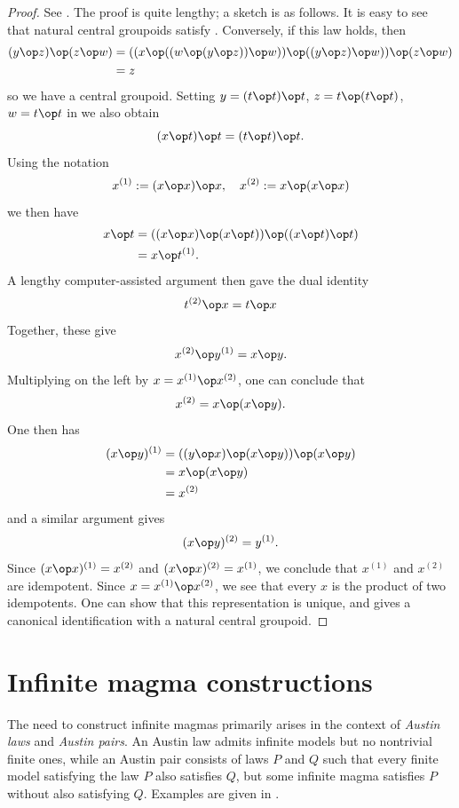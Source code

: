 \begin{proof}
  See \cite[Theorem 5]{knuth}.  The proof is quite lengthy; a sketch is as follows. It is easy to see that natural central groupoids satisfy .  Conversely, if this law holds, then
\begin{align*}
  (y \op z) \op (z \op w) &= (( x \op ((w \op (y \op z)) \op w)) \op ((y \op z) \op w)) \op (z \op w)\\
  &= z
\end{align*}
so we have a central groupoid.  Setting $y = (t \op t) \op t$, $z = t \op (t \op t)$, $w = t \op t$ in  we also obtain
$$ (x \op t) \op t = (t \op t) \op t.$$
Using the notation
$$ x^{(1)} := (x \op x) \op x, \quad x^{(2)} := x \op (x \op x)$$
we then have
\begin{align*}
  x \op t &= ((x \op x) \op (x \op t)) \op ((x \op t) \op t) \\
  &= x \op t^{(1)}.
\end{align*}
A lengthy computer-assisted argument then gave the dual identity
$$ t^{(2)} \op x = t \op x$$
Together, these give
$$ x^{(2)} \op y^{(1)} = x \op y.$$
Multiplying on the left by $x = x^{(1)}\op x^{(2)}$, one can conclude that
$$ x^{(2)} = x \op (x \op y).$$
One then has
\begin{align*}
  (x \op y)^{(1)} &= ((y \op x) \op (x \op y)) \op (x \op y) \\
&= x \op (x \op y) \\
&= x^{(2)}
\end{align*}
and a similar argument gives
$$ (x \op y)^{(2)} = y^{(1)}.$$
Since $(x \op x)^{(1)} = x^{(2)}$ and $(x \op x)^{(2)} = x^{(1)}$, we conclude that $x^{(1)}$ and $x^{(2)}$ are idempotent.  Since $x = x^{(1)} \op x^{(2)}$, we see that every $x$ is the product of two idempotents.  One can show that this representation is unique, and gives a canonical identification with a natural central groupoid.
\end{proof}


\chapter{Infinite magma constructions}\label{infinite-magma-constructions-chapter}

The need to construct infinite magmas primarily arises in the context of \emph{Austin laws} and \emph{Austin pairs}.
An Austin law admits infinite models but no nontrivial finite ones, while an Austin pair consists of
laws $P$ and $Q$ such that every finite model satisfying the law $P$ also satisfies $Q$, but some
infinite magma satisfies $P$ without also satisfying $Q$. Examples are given in .

